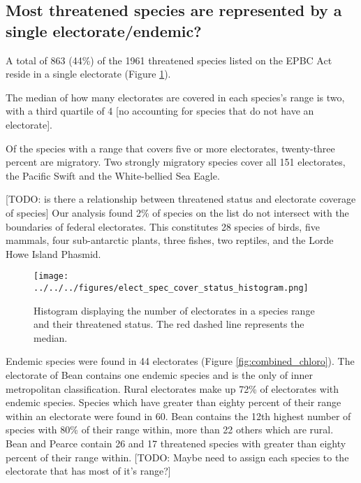 \documentclass[a4paper,11pt]{article}
\begin{document}
\subsection{Most threatened species are represented by a single electorate/endemic?}

A total of 863 (44\%) of the 1961 threatened species listed on the EPBC Act reside in a single electorate (Figure \ref{fig:hist}). 

The median of how many electorates are covered in each species's range is two, with a third quartile of 4 [no accounting for species that do not have an electorate].

Of the species with a range that covers five or more electorates, twenty-three percent are migratory. Two strongly migratory species cover all 151 electorates, the Pacific Swift and the White-bellied Sea Eagle. 

[TODO: is there a relationship between threatened status and electorate coverage of species]
Our analysis found 2\% of species on the list do not intersect with the boundaries of federal electorates. This constitutes 28 species of birds, five mammals, four sub-antarctic plants, three fishes, two reptiles, and the Lorde Howe Island Phasmid. 

\begin{figure}[H]
	\centering
    \texttt{[image: ../../../figures/elect\_spec\_cover\_status\_histogram.png]}
    \caption{Histogram displaying the number of electorates in a species range and their threatened status. The red dashed line represents the median.}
    \label{fig:hist}
\end{figure}


Endemic species were found in 44 electorates (Figure \ref{fig:combined_chloro}). The electorate of Bean contains one endemic species and is the only of inner metropolitan classification. Rural electorates make up 72\% of electorates with endemic species. Species which have greater than eighty percent of their range within an electorate were found in 60. Bean contains the 12th highest number of species with 80\% of their range within, more than 22 others which are rural. Bean and Pearce contain 26 and 17 threatened species with greater than eighty percent of their range within.
[TODO: Maybe need to assign each species to the electorate that has most of it's range?]
\end{document}
